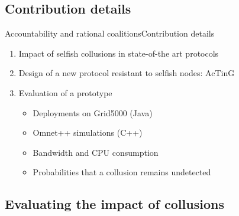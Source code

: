 \documentclass[10pt]{beamer}
\begin{document}
\subsection{Contribution details}
\begin{frame}{Accountability and rational coalitions}{Contribution details}
      \begin{enumerate}
        \item Impact of selfish collusions in state-of-the art protocols
        \item Design of a new protocol resistant to selfish nodes: AcTinG
        \item Evaluation of a prototype
        \begin{itemize}
          \item Deployments on Grid5000 (Java)
          \item Omnet++ simulations (C++)
          \item Bandwidth and CPU consumption
          \item Probabilities that a collusion remains undetected
          \end{itemize}
      \end{enumerate}
\end{frame}

\subsection{Evaluating the impact of collusions}
\end{document}
